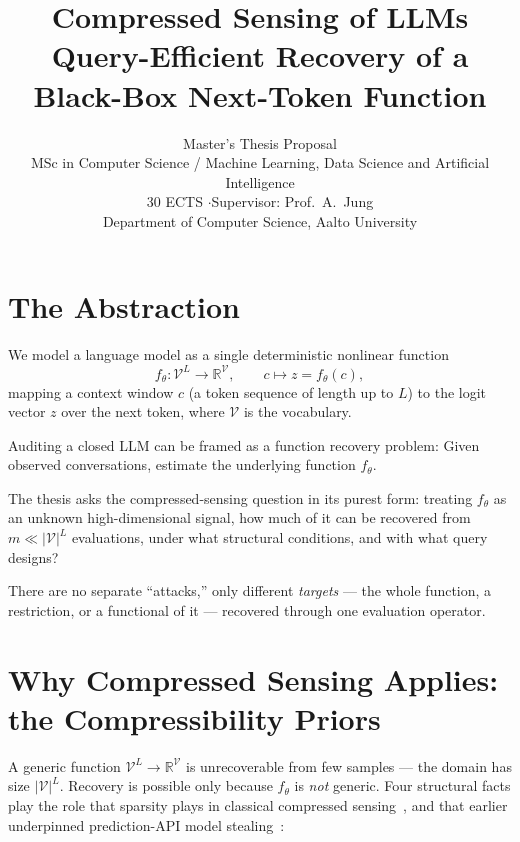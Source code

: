 \documentclass[11pt,a4paper]{article}
\title{\textbf{Compressed Sensing of LLMs}\\[0.3em]
\large Query-Efficient Recovery of a Black-Box Next-Token Function}
\author{Master's Thesis Proposal\\[0.4em]
\normalsize MSc in Computer Science / Machine Learning, Data Science and Artificial Intelligence\\
\normalsize 30 ECTS \quad$\cdot$\quad Supervisor: Prof.\ A.\ Jung\\
\normalsize Department of Computer Science, Aalto University}
\date{}
\theoremstyle{definition}
\newcommand{\Voc}{\mathcal{V}}
\newcommand{\RR}{\mathbb{R}}
\begin{document}
\maketitle

\section{The Abstraction}

We model a language model as a single deterministic nonlinear function
\[
  f_\theta : \Voc^L \to \RR^{\Voc}, \qquad c \mapsto z = f_\theta(c),
\]
mapping a context window $c$ (a token sequence of length up to $L$) to the logit
vector $z$ over the next token, where $\Voc$ is the vocabulary. 

Auditing a closed LLM can be framed as a function recovery problem: Given observed 
conversations, estimate the underlying function $f_\theta$.

The thesis asks the compressed-sensing question in its purest form: 
treating $f_\theta$ as an unknown high-dimensional signal, how much of 
it can be recovered from $m \ll |\Voc|^L$ evaluations, under what 
structural conditions, and with what query designs?

There are no separate ``attacks,'' only different \emph{targets} --- the whole
function, a restriction, or a functional of it --- recovered through one
evaluation operator.

\section{Why Compressed Sensing Applies: the Compressibility Priors}

A generic function $\Voc^L \to \RR^{\Voc}$ is unrecoverable from few samples ---
the domain has size $|\Voc|^L$. Recovery is possible only because $f_\theta$ is
\emph{not} generic. Four structural facts play the role that sparsity plays in
classical compressed sensing~\citep{candes2005decoding,donoho2006compressed,candestao2006near},
and that earlier underpinned prediction-API model
stealing~\citep{tramer2016stealing}:
\end{document}
